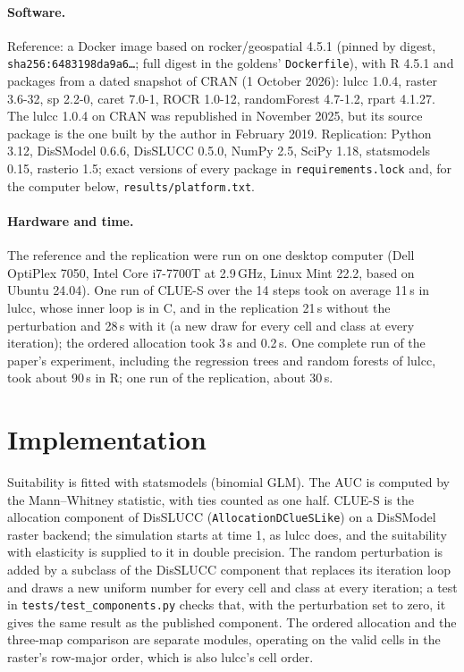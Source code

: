 \paragraph{Software.} Reference: a Docker image based on rocker/geospatial 4.5.1 (pinned by digest,
\texttt{sha256:6483198da9a6\ldots}; full digest in the goldens' \texttt{Dockerfile}), with
R 4.5.1 and packages from a dated snapshot of CRAN (1 October 2026): lulcc 1.0.4, raster
3.6-32, sp 2.2-0, caret 7.0-1, ROCR 1.0-12, randomForest 4.7-1.2, rpart 4.1.27. The lulcc
1.0.4 on CRAN was republished in November 2025, but its source package is the one built
by the author in February 2019. Replication: Python 3.12, DisSModel 0.6.6, DisSLUCC 0.5.0,
NumPy 2.5\supercite{Harris:2020}, SciPy 1.18\supercite{Virtanen:2020}, statsmodels
0.15\supercite{Seabold:2010}, rasterio 1.5; exact versions of every package in
\texttt{requirements\allowbreak.lock} and, for the computer below, \texttt{results/\allowbreak platform.txt}.

\paragraph{Hardware and time.} The reference and the replication were run on one
desktop computer (Dell OptiPlex 7050, Intel Core i7-7700T at 2.9\,GHz, Linux Mint 22.2, based on Ubuntu 24.04). One run of CLUE-S over the 14 steps took on average 11\,s in lulcc, whose inner loop
is in C, and in the replication 21\,s without the perturbation and 28\,s with it (a new
draw for every cell and class at every iteration); the ordered allocation took 3\,s and
0.2\,s. One complete run of the
paper's experiment, including the regression trees and random forests of lulcc, took
about 90\,s in R; one run of the replication, about 30\,s.

\section{Implementation}

Suitability is fitted with statsmodels (binomial GLM). The AUC is computed by the
Mann--Whitney statistic, with ties counted as one half. CLUE-S is the allocation
component of DisSLUCC (\texttt{AllocationDClue\-SLike}) on a DisSModel raster backend;
the simulation starts at time 1, as lulcc does, and the suitability with elasticity is
supplied to it in double precision. The random perturbation is added by a subclass of
the DisSLUCC component that replaces its iteration loop and draws a new uniform number
for every cell and class at every iteration; a test in \texttt{tests/test\_components.py} checks that, with
the perturbation set to zero, it gives the same result as the published component. The ordered allocation and the three-map comparison are separate
modules, operating on the valid cells in the raster's row-major order, which is also
lulcc's cell order.

